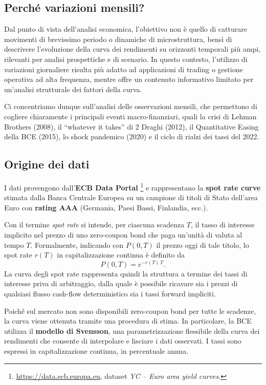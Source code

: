 \documentclass[11pt,a4paper]{article}
\theoremstyle{plain}
\theoremstyle{definition}
\theoremstyle{remark}
\begin{document}
\subsection{Perché variazioni mensili?}
\label{sec:motivazione-mensile}

Dal punto di vista dell’analisi economica, l’obiettivo non è quello di catturare movimenti
di brevissimo periodo o dinamiche di microstruttura, bensì di descrivere l’evoluzione della
curva dei rendimenti su orizzonti temporali più ampi, rilevanti per analisi prospettiche e
di scenario. In questo contesto, l’utilizzo di variazioni giornaliere risulta più adatto ad
applicazioni di trading o gestione operativa ad alta frequenza, mentre offre un contenuto
informativo limitato per un’analisi strutturale dei fattori della curva.

Ci concentriamo dunque sull'analisi delle osservazioni mensili, che permettono di cogliere chiaramente i principali eventi
macro-finanziari, quali la crisi di Lehman Brothers (2008), il “whatever it takes” di
2
Draghi (2012), il Quantitative Easing della BCE (2015), lo shock pandemico (2020) e
il ciclo di rialzi dei tassi del 2022.

\subsection{Origine dei dati}

I dati provengono dall'\textbf{ECB Data Portal}%
\footnote{\url{https://data.ecb.europa.eu}, dataset \emph{YC -- Euro area yield curves}.}
e rappresentano la \textbf{spot rate curve} stimata dalla Banca Centrale Europea
su un campione di titoli di Stato dell'area Euro con \textbf{rating AAA}
(Germania, Paesi Bassi, Finlandia, ecc.). 

Con il termine \emph{spot rate} si intende, per ciascuna scadenza $T$, il tasso
di interesse implicito nel prezzo di uno zero-coupon bond che paga un'unità di
valuta al tempo $T$. Formalmente, indicando con $P(0,T)$ il prezzo oggi di tale
titolo, lo spot rate $r(T)$ in capitalizzazione continua è definito da
\[
P(0,T) = e^{-r(T) \, T}.
\]
La curva degli spot rate rappresenta quindi la struttura a termine dei tassi
di interesse priva di arbitraggio, dalla quale è possibile ricavare sia i prezzi
di qualsiasi flusso cash-flow deterministico sia i tassi forward impliciti.

Poiché sul mercato non sono disponibili zero-coupon bond per tutte le scadenze,
la curva viene ottenuta tramite una procedura di stima. In particolare, la BCE
utilizza il \textbf{modello di Svensson}, una parametrizzazione flessibile della
curva dei rendimenti che consente di interpolare e lisciare i dati osservati.
I tassi sono espressi in capitalizzazione continua, in percentuale annua.
\end{document}
